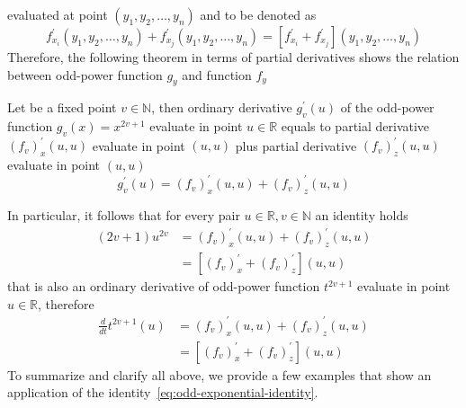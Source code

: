 evaluated at point $(y_1, y_2, \dots, y_n)$ and to be denoted as
\begin{equation*}
    f^{'}_{x_i} (y_1, y_2, \dots, y_n) + f^{'}_{x_j} (y_1, y_2, \dots, y_n) = [f^{'}_{x_i} + f^{'}_{x_j}]
    (y_1, y_2, \dots, y_n)
\end{equation*}
Therefore, the following theorem in terms of partial derivatives
shows the relation between odd-power function $g_{y}$ and function $f_{y}$
\begin{thm}
    \label{thm:main-theorem}
    Let be a fixed point $v\in \mathbb{N}$, then ordinary derivative $g_v^{'}(u)$ of the odd-power function $g_v(x) = x^{2v + 1}$
    evaluate in point $u\in\mathbb{R}$ equals to partial derivative $(f_{v})^{'}_{x} (u, u)$ evaluate in point $(u, u)$ plus
    partial derivative $(f_{v})^{'}_{z} (u, u)$ evaluate in point $(u, u)$
    \begin{equation}
        g_v^{'} (u) = (f_{v})^{'}_{x} (u, u) + (f_{v})^{'}_{z} (u, u)
        \label{eq:odd-exponential-identity}
    \end{equation}
\end{thm}
In particular, it follows that for every pair $u \in \mathbb{R}, v \in \mathbb{N}$ an identity holds
\begin{align*}
(2v+1)
    u^{2v} &= (f_{v})^{'}_{x} (u, u) + (f_{v})^{'}_{z} (u, u) \\
    &= [(f_{v})^{'}_{x} + (f_{v})^{'}_{z}](u,u)
\end{align*}
that is also an ordinary derivative of odd-power function $t^{2v+1}$ evaluate in point $u\in\mathbb{R}$, therefore
\begin{align*}
    \frac{d}{dt} t^{2v+1} (u) &= (f_{v})^{'}_{x} (u, u) + (f_{v})^{'}_{z} (u, u) \\
    &= [(f_{v})^{'}_{x} + (f_{v})^{'}_{z}](u,u)
\end{align*}
To summarize and clarify all above, we provide a few examples that show
an application of the identity~\eqref{eq:odd-exponential-identity}.
